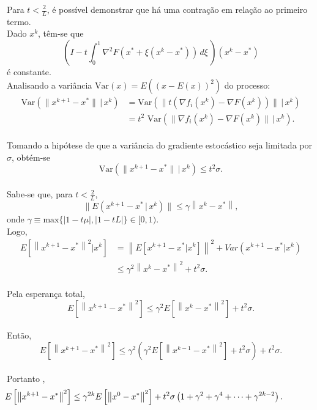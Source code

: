 \documentclass[a4paper,12pt]{article}
\begin{document}
Para $t< \frac{2}{L}$, é possível demonstrar \cite{bottou2016optimization}  que há uma contração em relação ao primeiro termo.\\

Dado $x^k$, têm-se que  
$$\left(I - t \int_{0}^1 \nabla^2 F(x^*+\xi(x^k-x^*))\, d \xi \,\right)(x^k - x^*)$$
é constante.\\

Analisando a variância $\text{Var}(x)=E((x-E(x))^2)$ do processo:	 
\begin{align*}
\text{Var} (\|x^{k+1} - x^*\| \, | \, x^k) & = \text{Var} (\|t (\nabla f_i(x^k) - \nabla F(x^k))\| \, | \,x^k) \\
& = t^2 \text{ Var}(\|\nabla f_i(x^k) - \nabla F(x^k)\| \, | \,x^k).
\end{align*}\\

Tomando a hipótese de que a variância do gradiente estocástico seja limitada por $\sigma$, obtém-se
$$\text{Var} (\|x^{k+1} - x^*\| \, | \, x^k) \leq t^2 \sigma.$$\\
Sabe-se que, para $t <\frac{2}{L}$,  
$$\|E(x^{k+1} - x^* \, | \, x^k )\|\leq \gamma \left \|x^k - x^*\right \|,$$
onde	$\gamma \equiv \text{max}\{\left | 1 - t\mu\right |, \left | 1 - t L \right |\} \in[0,1)$.\\

Logo,
\begin{align*}
E \left[\left \| x^{k+1} - x^* \right \|^2|x^k \right] & = \left \| E[x^{k+1} - x^*|x^k] \right \|^2 + Var(x^{k+1} - x^*|x^k) \\
& \le \gamma^2 \left \| x^k - x^* \right \|^2 + t^2 \sigma.
\end{align*}\\

Pela esperança total, 
$$E \left[\left \| x^{k+1} - x^* \right \|^2\right] \le \gamma^2 E\left[\left \| x^{k} - x^* \right \|^2\right] + t^2 \sigma.$$\\

 Então,
$$E \left[\left \| x^{k+1} - x^* \right \|^2\right] \le \gamma^2 (\gamma^2 E\left[\left \| x^{k-1} - x^* \right \|^2\right] + t^2 \sigma)  + t^2 \sigma.$$\\

 Portanto ,
$$\hspace{-1.4cm}E \left[\left \| x^{k+1} - x^* \right \|^2\right] \le  \gamma^{2k} E\left[\left \| x^{0} - x^* \right \|^2\right]+t^2 \sigma \left(1+\gamma^{2}+\gamma^{4}+ \cdots + \gamma^{2k-2} \right).$$
\end{document}
